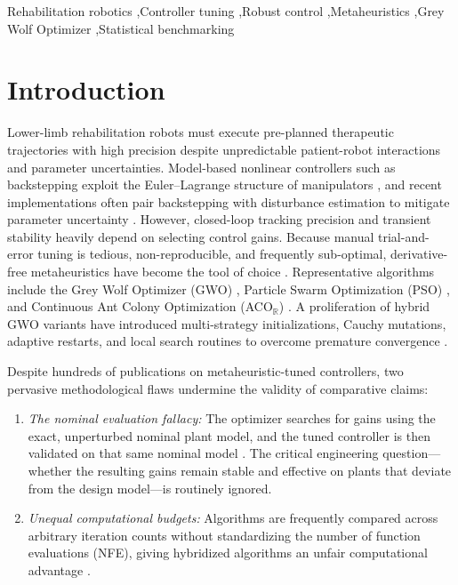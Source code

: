 \documentclass[a4paper,fleqn]{cas-dc}
\newcommand{\acor}{ACO$_\mathbb{R}$}
\begin{document}
\begin{keywords}
Rehabilitation robotics \sep Controller tuning \sep Robust control \sep Metaheuristics \sep Grey Wolf Optimizer \sep Statistical benchmarking
\end{keywords}

\maketitle

\section{Introduction}
Lower-limb rehabilitation robots must execute pre-planned therapeutic trajectories with high precision despite unpredictable patient-robot interactions and parameter uncertainties. Model-based nonlinear controllers such as backstepping \cite{krstic1995,khalil2002} exploit the Euler--Lagrange structure of manipulators \cite{spong2006}, and recent implementations often pair backstepping with disturbance estimation to mitigate parameter uncertainty \cite{peng2022,ren2025}. However, closed-loop tracking precision and transient stability heavily depend on selecting control gains. Because manual trial-and-error tuning is tedious, non-reproducible, and frequently sub-optimal, derivative-free metaheuristics have become the tool of choice \cite{azeez2023,dai2023}. Representative algorithms include the Grey Wolf Optimizer (GWO) \cite{mirjalili2014}, Particle Swarm Optimization (PSO) \cite{kennedy1995,shi1998,clerc2002}, and Continuous Ant Colony Optimization (\acor{}) \cite{socha2008,dorigo1997}. A proliferation of hybrid GWO variants have introduced multi-strategy initializations, Cauchy mutations, adaptive restarts, and local search routines to overcome premature convergence \cite{crepinsek2013,neri2012,blum2003}.

Despite hundreds of publications on metaheuristic-tuned controllers, two pervasive methodological flaws undermine the validity of comparative claims:
\begin{enumerate}
\item \emph{The nominal evaluation fallacy:} The optimizer searches for gains using the exact, unperturbed nominal plant model, and the tuned controller is then validated on that same nominal model \cite{sorensen2015,camacho2023}. The critical engineering question---whether the resulting gains remain stable and effective on plants that deviate from the design model---is routinely ignored.
\item \emph{Unequal computational budgets:} Algorithms are frequently compared across arbitrary iteration counts without standardizing the number of function evaluations (NFE), giving hybridized algorithms an unfair computational advantage \cite{kudela2022,kononova2014}.
\end{enumerate}
\end{document}

